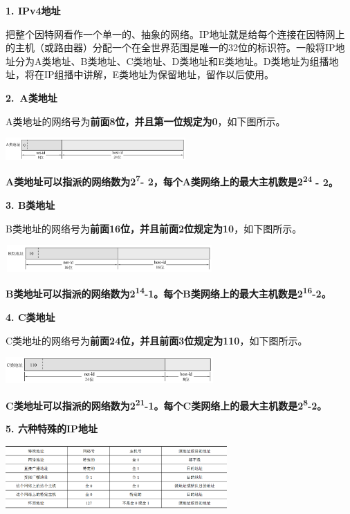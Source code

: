 \textbf{{1. IPv4地址}}

把整个因特网看作一个单一的、抽象的网络。IP地址就是给每个连接在因特网上的主机（或路由器）分配一个在全世界范围是唯一的32位的标识符。一般将IP地址分为A类地址、B类地址、C类地址、D类地址和E类地址。D类地址为组播地址，将在IP组播中讲解，E类地址为保留地址，留作以后使用。

\textbf{{2.~}{A类地址}}

A类地址的网络号为\textbf{{前面8位，并且第一位规定为0}}，如下图所示。

{\includegraphics[width=2.70833in,height=0.33333in]{png-jpeg-pics/1A65DA1BD563DCDF16ECBAEF3C8B8C28.png}}

{{\textbf{A类地址可以指派的网络数为2}}\textsuperscript{{\textbf{7}}}{\textbf{-
2，}}{\textbf{{}{\textbf{每个A类网络上的最大主机数是2}}}}}\textsuperscript{{\textbf{24}}}{{
\textbf{- 2}}{\textbf{。}}}

{\textbf{{3. B}{类地址}}\\
}

{B类地址的网络号为\textbf{{前面16位，并且前面2位规定为10}}，如下图所示。}

\includegraphics[width=3.12500in,height=0.40625in]{png-jpeg-pics/EA22F34752120C466F978054181B120D.png}

\textbf{{B类地址可以指派的网络数为2}\textsuperscript{{14}}{-1。每个B类网络上的最大主机数是2}\textsuperscript{{16}}{-2。}{}}

\textbf{\textbf{{4. C}{类地址}}\\
}

C类地址的网络号为\textbf{{前面24位，并且前面3位规定为110}}，如下图所示。

\includegraphics[width=3.12500in,height=0.39583in]{png-jpeg-pics/B14CB902462B4FC67C1283133496374C.png}

{\textbf{C类地址可以指派的网络数为2}}\textsuperscript{{\textbf{21}}}{\textbf{-1。\textbf{{每个C类网络上的最大主机数是}}2}}\textsuperscript{{\textbf{8}}}{\textbf{-2。}}

{\textbf{5. 六种特殊的IP地址}}

{\textbf{\includegraphics[width=3.33333in,height=0.94792in]{png-jpeg-pics/C5C2806E4ECEF23CF1FA33782EB94ECB.png}\\
}}
